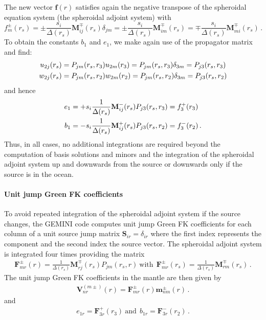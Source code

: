 \documentclass[12pt,a4paper]{article}
\begin{document}
The new vector $\mathbf{f}(r)$ satisfies again the negative transpose of the spheroidal equation system (the spheroidal adjoint system) with 
\begin{equation}
f_m^\pm(r_s) = \pm \frac{s_i}{\Delta(r_s)}\mathbf{M}^\mp_{ij}(r_s)\delta_{jm} = \pm \frac{s_i}{\Delta(r_s)}\mathbf{M}^\mp_{im}(r_s)= \mp \frac{s_i}{\Delta(r_s)}\mathbf{M}^\mp_{mi}(r_s)\,.
\end{equation}
To obtain the constants $b_1$ and $e_1$, we make again use of the propagator matrix and find:
\begin{align}
u_{2j}(r_s) &= P_{jm}(r_s,r_3) u_{2m}(r_3) = P_{jm}(r_s,r_3) \delta_{3m} = P_{j3}(r_s,r_3) \notag \\
w_{2j}(r_s) &= P_{jm}(r_s,r_2) w_{2m}(r_2) = P_{jm}(r_s,r_2) \delta_{3m} = P_{j3}(r_s,r_2) \notag \\
\end{align}
and hence
\begin{align}
e_1 &= +s_i\frac{1}{\Delta(r_s)}\mathbf{M}^-_{ij}(r_s)P_{j3}(r_s,r_3) = f_3^+(r_3) \notag \\ 
b_1 &= -s_i\frac{1}{\Delta(r_s)}\mathbf{M}^+_{ij}(r_s)P_{j3}(r_s,r_2) = f_3^-(r_2) \,.
\end{align}
Thus, in all cases, no additional integrations are required beyond the computation of basis solutions and minors and the integration of the spheroidal adjoint system up and downwards from the source or downwards only if the source is in the ocean.
%
\paragraph{Unit jump Green FK coefficients}
%
To avoid repeated integration of the spheroidal adjoint system if the source changes, the GEMINI code computes unit jump Green FK coefficients for each column of a unit source jump matrix $\mathbf{S}_{ir} = \delta_{ir}$ where the first index represents the component and the second index the source vector. The spheroidal adjoint system is integrated four times providing the matrix
\begin{align}
\mathbf{F}^\pm_{mr}(r) = \frac{1}{\Delta(r_s)}\mathbf{M}^\mp_{rj}(r_s) P_{jm}(r_s,r)\ \mathrm{with}\ \ 
\mathbf{F}^\pm_{mr}(r_s) = \frac{1}{\Delta(r_s)}\mathbf{M}^\mp_{rm}(r_s) \,.
\end{align}
The unit jump Green FK coefficients in the mantle are then given by
\begin{align}
\mathbf{V}^{(m\pm)}_{nr}(r) = \mathbf{F}^\pm_{mr}(r)\mathbf{m}^{\pm}_{nm}(r)\,.
\end{align}
and 
\begin{align}
e_{1r} = \mathbf{F}^+_{3r}(r_3) \ \mathrm{and}\ \ b_{1r} = \mathbf{F}^-_{3r}(r_2) \,.
\end{align}
\end{document}

